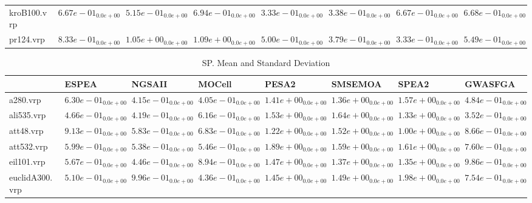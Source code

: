 \documentclass{article}
\begin{document}
\begin{table}
\begin{scriptsize}
\begin{tabular}{llllllll}
kroB100.vrp & $  6.67e-01_{ 0.0e+00}$ & $  5.15e-01_{ 0.0e+00}$ & $  6.94e-01_{ 0.0e+00}$ & \cellcolor{gray95}$  3.33e-01_{ 0.0e+00}$ & \cellcolor{gray25}$  3.38e-01_{ 0.0e+00}$ & $  6.67e-01_{ 0.0e+00}$ & $  6.68e-01_{ 0.0e+00}$ \\
pr124.vrp & $  8.33e-01_{ 0.0e+00}$ & $  1.05e+00_{ 0.0e+00}$ & $  1.09e+00_{ 0.0e+00}$ & $  5.00e-01_{ 0.0e+00}$ & \cellcolor{gray25}$  3.79e-01_{ 0.0e+00}$ & \cellcolor{gray95}$  3.33e-01_{ 0.0e+00}$ & $  5.49e-01_{ 0.0e+00}$ \\
\hline
\end{tabular}
\end{scriptsize}
\end{table}

\begin{table}
\caption{SP. Mean and Standard Deviation}
\label{table: SP}
\centering
\begin{scriptsize}
\begin{tabular}{llllllll}
\hline & ESPEA & NGSAII & MOCell & PESA2 & SMSEMOA & SPEA2 &  GWASFGA\\
\hline 
a280.vrp & $  6.30e-01_{ 0.0e+00}$ & \cellcolor{gray25}$  4.15e-01_{ 0.0e+00}$ & \cellcolor{gray95}$  4.05e-01_{ 0.0e+00}$ & $  1.41e+00_{ 0.0e+00}$ & $  1.36e+00_{ 0.0e+00}$ & $  1.57e+00_{ 0.0e+00}$ & $  4.84e-01_{ 0.0e+00}$ \\
ali535.vrp & $  4.66e-01_{ 0.0e+00}$ & \cellcolor{gray25}$  4.19e-01_{ 0.0e+00}$ & $  6.16e-01_{ 0.0e+00}$ & $  1.53e+00_{ 0.0e+00}$ & $  1.64e+00_{ 0.0e+00}$ & $  1.33e+00_{ 0.0e+00}$ & \cellcolor{gray95}$  3.52e-01_{ 0.0e+00}$ \\
att48.vrp & $  9.13e-01_{ 0.0e+00}$ & \cellcolor{gray95}$  5.83e-01_{ 0.0e+00}$ & \cellcolor{gray25}$  6.83e-01_{ 0.0e+00}$ & $  1.22e+00_{ 0.0e+00}$ & $  1.52e+00_{ 0.0e+00}$ & $  1.00e+00_{ 0.0e+00}$ & $  8.66e-01_{ 0.0e+00}$ \\
att532.vrp & $  5.99e-01_{ 0.0e+00}$ & \cellcolor{gray95}$  5.38e-01_{ 0.0e+00}$ & \cellcolor{gray25}$  5.46e-01_{ 0.0e+00}$ & $  1.89e+00_{ 0.0e+00}$ & $  1.59e+00_{ 0.0e+00}$ & $  1.61e+00_{ 0.0e+00}$ & $  7.60e-01_{ 0.0e+00}$ \\
eil101.vrp & \cellcolor{gray25}$  5.67e-01_{ 0.0e+00}$ & \cellcolor{gray95}$  4.46e-01_{ 0.0e+00}$ & $  8.94e-01_{ 0.0e+00}$ & $  1.47e+00_{ 0.0e+00}$ & $  1.37e+00_{ 0.0e+00}$ & $  1.35e+00_{ 0.0e+00}$ & $  9.86e-01_{ 0.0e+00}$ \\
euclidA300.vrp & \cellcolor{gray25}$  5.10e-01_{ 0.0e+00}$ & $  9.96e-01_{ 0.0e+00}$ & \cellcolor{gray95}$  4.36e-01_{ 0.0e+00}$ & $  1.45e+00_{ 0.0e+00}$ & $  1.49e+00_{ 0.0e+00}$ & $  1.98e+00_{ 0.0e+00}$ & $  7.54e-01_{ 0.0e+00}$ \\

\end{tabular}
\end{scriptsize}
\end{table}
\end{document}
